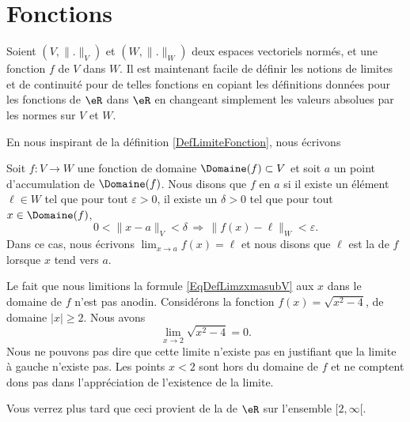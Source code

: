 \section{Fonctions}		\label{Sect_fonctions}

Soient $(V,\| . \|_V)$ et $(W,\| . \|_W)$ deux espaces vectoriels normés, et une fonction $f$ de $V$ dans $W$. Il est maintenant facile de définir les notions de limites et de continuité pour de telles fonctions en copiant les définitions données pour les fonctions de $\eR$ dans $\eR$ en changeant simplement les valeurs absolues par les normes sur $V$ et $W$.

En nous inspirant de la définition \ref{DefLimiteFonction}, nous écrivons
\begin{definition}		\label{LimiteDansEVN}
	Soit $f\colon V\to W$ une fonction de domaine \( \Domaine(f)\subset V\) et soit $a$ un point d'accumulation de $\Domaine(f)$. Nous disons que $f$  en $a$ si il existe un élément $\ell\in W$ tel que pour tout $\varepsilon>0$, il existe un $\delta>0$ tel que pour tout $x\in \Domaine(f)$,
    \begin{equation}        \label{EqDefLimzxmasubV}
		0<\| x-a \|_V<\delta\,\Rightarrow\,\| f(x)-\ell \|_W<\varepsilon.
	\end{equation}
	Dans ce cas, nous écrivons $\lim_{x\to a} f(x)=\ell$ et nous disons que $\ell$ est la  de $f$ lorsque $x$ tend vers $a$.
\end{definition}

\begin{remark}
    Le fait que nous limitions la formule \eqref{EqDefLimzxmasubV} aux \( x\) dans le domaine de \( f\) n'est pas anodin. Considérons la fonction \( f(x)=\sqrt{x^2-4}\), de domaine \( | x |\geq 2\). Nous avons
    \begin{equation}
        \lim_{x\to 2} \sqrt{x^2-4}=0.
    \end{equation}
    Nous ne pouvons pas dire que cette limite n'existe pas en justifiant que la limite à gauche n'existe pas. Les points \( x<2\) sont hors du domaine de \( f\) et ne comptent dons pas dans l'appréciation de l'existence de la limite.

    Vous verrez plus tard que ceci provient de la  de \( \eR\) sur l'ensemble \( \mathopen[ 2 , \infty [\).
\end{remark}

